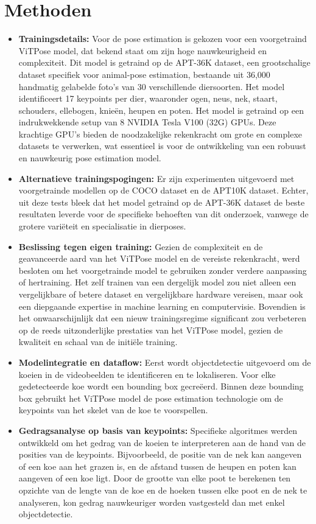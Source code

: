 \section{Methoden}
\begin{itemize}
  \item \textbf{Trainingsdetails:} Voor de pose estimation is gekozen voor een voorgetraind ViTPose model, dat bekend staat om zijn hoge nauwkeurigheid en complexiteit. Dit model is getraind op de APT-36K dataset, een grootschalige dataset specifiek voor animal-pose estimation, bestaande uit 36,000 handmatig gelabelde foto's van 30 verschillende diersoorten. Het model identificeert 17 keypoints per dier, waaronder ogen, neus, nek, staart, schouders, ellebogen, knieën, heupen en poten. Het model is getraind op een indrukwekkende setup van 8 NVIDIA Tesla V100 (32G) GPUs. Deze krachtige GPU's bieden de noodzakelijke rekenkracht om grote en complexe datasets te verwerken, wat essentieel is voor de ontwikkeling van een robuust en nauwkeurig pose estimation model.
  \item \textbf{Alternatieve trainingspogingen:} Er zijn experimenten uitgevoerd met voorgetrainde modellen op de COCO dataset en de APT10K dataset. Echter, uit deze tests bleek dat het model getraind op de APT-36K dataset de beste resultaten leverde voor de specifieke behoeften van dit onderzoek, vanwege de grotere variëteit en specialisatie in dierposes.
  \item \textbf{Beslissing tegen eigen training:} Gezien de complexiteit en de geavanceerde aard van het ViTPose model en de vereiste rekenkracht, werd besloten om het voorgetrainde model te gebruiken zonder verdere aanpassing of hertraining. Het zelf trainen van een dergelijk model zou niet alleen een vergelijkbare of betere dataset en vergelijkbare hardware vereisen, maar ook een diepgaande expertise in machine learning en computervisie. Bovendien is het onwaarschijnlijk dat een nieuw trainingsregime significant zou verbeteren op de reeds uitzonderlijke prestaties van het ViTPose model, gezien de kwaliteit en schaal van de initiële training.
  \item \textbf{Modelintegratie en dataflow:} Eerst wordt objectdetectie uitgevoerd om de koeien in de videobeelden te identificeren en te lokaliseren. Voor elke gedetecteerde koe wordt een bounding box gecreëerd. Binnen deze bounding box gebruikt het ViTPose model de pose estimation technologie om de keypoints van het skelet van de koe te voorspellen.
  \item \textbf{Gedragsanalyse op basis van keypoints:} Specifieke algoritmes werden ontwikkeld om het gedrag van de koeien te interpreteren aan de hand van de posities van de keypoints. Bijvoorbeeld, de positie van de nek kan aangeven of een koe aan het grazen is, en de afstand tussen de heupen en poten kan aangeven of een koe ligt. Door de grootte van elke poot te berekenen ten opzichte van de lengte van de koe en de hoeken tussen elke poot en de nek te analyseren, kon gedrag nauwkeuriger worden vastgesteld dan met enkel objectdetectie.
\end{itemize}
